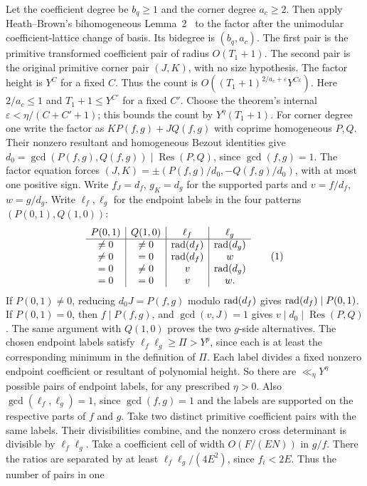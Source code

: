 Let the coefficient degree be $b_q\ge1$ and the corner degree $a_c\ge2$.
Then apply Heath--Brown's bihomogeneous Lemma~2~\cite{HB2012} to the
factor after the unimodular coefficient-lattice change of basis.  Its
bidegree is $(b_q,a_c)$.  The first pair is the primitive transformed
coefficient pair of radius $O(T_1+1)$.  The second pair is the original
primitive corner pair $(J,K)$, with no size hypothesis.  The factor height
is $Y^C$ for a fixed $C$.  Thus the count is
$O((T_1+1)^{2/a_c+\varepsilon}Y^{C\varepsilon})$.  Here $2/a_c\le1$ and
$T_1+1\le Y^{C'}$ for a fixed $C'$.  Choose the theorem's internal
$\varepsilon<\eta/(C+C'+1)$; this bounds the count by $Y^\eta(T_1+1)$.
For corner degree one write the factor as
$KP(f,g)+JQ(f,g)$ with coprime homogeneous $P,Q$.  Their nonzero resultant
and homogeneous Bezout identities give
$d_0=\gcd(P(f,g),Q(f,g))\mid\operatorname{Res}(P,Q)$, since
$\gcd(f,g)=1$.  The factor equation forces
$(J,K)=\pm(P(f,g)/d_0,-Q(f,g)/d_0)$, with at most one positive sign.
Write $f_J=d_f$, $g_K=d_g$ for the supported parts and
$v=f/d_f$, $w=g/d_g$.
Write \(\ell_f,\ell_g\) for the endpoint labels in the four patterns
\((P(0,1),Q(1,0))\):
\[
\begin{array}{c|c|c|c}
P(0,1)&Q(1,0)&\ell_f&\ell_g\\ \hline
\ne0&\ne0&\rad(d_f)&\rad(d_g)\\
\ne0&=0&\rad(d_f)&w\\
=0&\ne0&v&\rad(d_g)\\
=0&=0&v&w .
\end{array}
\AutoTag{eq:old:6_18a}
\]
If $P(0,1)\ne0$, reducing $d_0J=P(f,g)$ modulo $\operatorname{rad}(d_f)$ gives
$\operatorname{rad}(d_f)\mid P(0,1)$.  If $P(0,1)=0$, then $f\mid P(f,g)$, and
$\gcd(v,J)=1$ gives $v\mid d_0\mid\operatorname{Res}(P,Q)$.  The same
argument with $Q(1,0)$ proves the two $g$-side alternatives.  The chosen
endpoint labels satisfy \(\ell_f\ell_g\ge\Pi>Y^p\), since each is at
least the corresponding minimum in the definition of \(\Pi\).  Each label
divides a fixed nonzero endpoint coefficient or resultant of polynomial
height.  So there are \(\ll_\eta Y^\eta\) possible pairs of endpoint
labels, for any prescribed $\eta>0$.  Also \(\gcd(\ell_f,\ell_g)=1\),
since \(\gcd(f,g)=1\) and the labels are supported on the respective parts
of \(f\) and \(g\).  Take two distinct primitive coefficient pairs with
the same labels.  Their divisibilities combine, and the nonzero cross
determinant is divisible by \(\ell_f\ell_g\).  Take a coefficient cell of
width $O(F/(EN))$ in $g/f$.  There the ratios are separated by at least
$\ell_f\ell_g/(4E^2)$, since $f_i<2E$.  Thus the number of pairs in one
